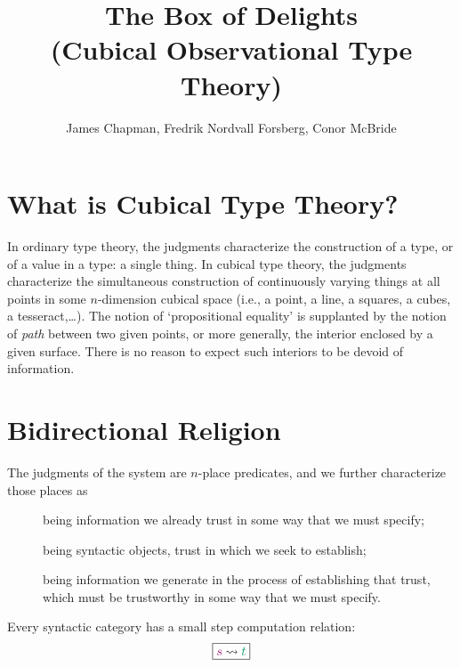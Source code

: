 \documentclass{article}
\begin{document}
\title{The Box of Delights\\
       (Cubical Observational Type Theory)}
\author{James Chapman, Fredrik Nordvall Forsberg, Conor McBride}
\maketitle

\newcommand{\V}[1]{\purple{\mathit{#1}}}
\newcommand{\JF}[1]{\framebox{\ensuremath{#1}}}
\newcommand{\sv}[1]{\purple{(\!\black{#1}\!)}}
\newcommand{\myv}{\overline}


\section{What is Cubical Type Theory?}

In ordinary type theory, the judgments characterize the construction of a type, or of a value in a type: a single thing. In cubical type theory, the judgments characterize the simultaneous construction of continuously varying things at all points in some $n$-dimension cubical space (i.e., a point, a line, a squares, a cubes, a tesseract,\ldots). The notion of `propositional equality' is supplanted by the notion of \emph{path} between two given points,
or more generally, the interior enclosed by a given surface. There is no reason to expect
such interiors to be devoid of information.


\section{Bidirectional Religion}

\newcommand{\INP}[1]{\pinkFG{#1}}
\newcommand{\SUB}[1]{\orange{#1}}
\newcommand{\OUP}[1]{\aquaFG{#1}}
\newcommand{\FIND}[1]{\dashv #1}

The judgments of the system are $n$-place predicates, and we further characterize those
places as
\begin{description}
\item[\INP{inputs}] being information we already trust in some way that we must specify;
\item[\SUB{subjects}] being syntactic objects, trust in which we seek to establish;
\item[\OUP{outputs}] being information we generate in the process of establishing that trust, which must be trustworthy in some way that we must specify.
\end{description}

Every syntactic category has a small step computation relation:
\[
\JF{\INP s \leadsto \OUP t}
\]
\end{document}
